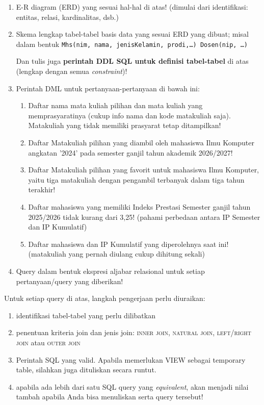\begin{deliverablebox}
    \begin{enumerate}
        \itemsep0em
     \item E-R diagram (ERD) yang sesuai hal-hal di atas! (dimulai dari identifikasi: entitas, relasi, kardinalitas, dsb.)
     \item Skema lengkap tabel-tabel basis data yang sesuai ERD yang dibuat; misal dalam bentuk \newline \texttt{Mhs(nim, nama, jenisKelamin, prodi,\dots) \newline Dosen(nip, \dots)}
     
     Dan tulis juga \textbf{perintah DDL SQL untuk definisi tabel-tabel} di atas (lengkap dengan semua \textit{constraint})!
     \item Perintah DML untuk pertanyaan-pertanyaan di bawah ini:
     \begin{enumerate}
         \itemsep0em \footnotesize
         \item Daftar nama mata kuliah pilihan dan mata kuliah yang memprasyaratinya (cukup info nama dan kode matakuliah saja).  Matakuliah yang tidak memiliki prasyarat tetap ditampilkan!
         \item Daftar Matakuliah pilihan yang diambil oleh mahasiswa Ilmu Komputer angkatan '2024' pada semester ganjil tahun akademik 2026/2027!
         \item Daftar Matakuliah pilihan yang favorit untuk mahasiswa Ilmu Komputer, yaitu tiga matakuliah dengan pengambil terbanyak dalam tiga tahun terakhir!
         \item Daftar mahasiswa yang memiliki Indeks Prestasi Semester ganjil tahun 2025/2026 tidak kurang dari 3,25! (pahami perbedaan antara IP Semester dan IP Kumulatif)
         \item Daftar mahasiswa dan IP Kumulatif yang diperolehnya saat ini! (matakuliah yang pernah diulang cukup dihitung sekali) 
     \end{enumerate}
     \item Query dalam bentuk ekspresi aljabar relasional untuk setiap pertanyaan/query yang diberikan!
    \end{enumerate}
\end{deliverablebox}

\vspace{.2cm}
Untuk setiap query di atas, langkah pengerjaan perlu diuraikan:
\begin{enumerate}
    \itemsep0em
     \item identifikasi tabel-tabel yang perlu dilibatkan
     \item penentuan kriteria join dan jenis join: \textsc{inner join, natural join, left/right join} atau \textsc{outer join}
     \item Perintah SQL yang valid. Apabila memerlukan \textsc{VIEW} sebagai temporary table, silahkan juga dituliskan secara runtut.
     \item apabila ada lebih dari satu SQL query yang \textit{equivalent}, akan menjadi nilai tambah apabila Anda bisa menuliskan serta query tersebut!
\end{enumerate}


